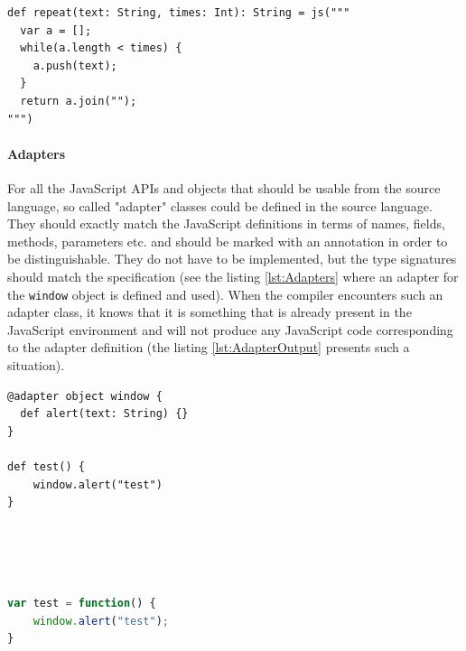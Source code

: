 \documentclass[12pt,a4paper]{report}
\begin{document}
\begin{minipage}{\linewidth}
\begin{lstlisting}[caption={Native code block example.},label={lst:NativeCodeBlock}]
def repeat(text: String, times: Int): String = js("""
  var a = [];
  while(a.length < times) {
    a.push(text);
  }
  return a.join("");
""")
\end{lstlisting}
\end{minipage}

\paragraph{Adapters} For all the JavaScript APIs and objects that should be usable from the source language, so called "adapter" classes could be defined in the source language. They should exactly match the JavaScript definitions in terms of names, fields, methods, parameters etc. and should be marked with an annotation in order to be distinguishable. They do not have to be implemented, but the type signatures should match the specification (see the listing \ref{lst:Adapters} where an adapter for the \texttt{window} object is defined and used). When the compiler encounters such an adapter class, it knows that it is something that is already present in the JavaScript environment and will not produce any JavaScript code corresponding to the adapter definition (the listing \ref{lst:AdapterOutput} presents such a situation).

\begin{center}
\begin{minipage}{.48\textwidth}
  \begin{lstlisting}[caption={Adapter definition and usage example.},label={lst:Adapters}]
@adapter object window {
  def alert(text: String) {}
}

def test() {
	window.alert("test")
}
  \end{lstlisting}
\end{minipage}
\hfill
\begin{minipage}{.48\textwidth}
  \begin{lstlisting}[language=JavaScript,caption={Adapter compilation output.},label={lst:AdapterOutput}]
	
	
	
	
var test = function() {
	window.alert("test");
}
  \end{lstlisting}
\end{minipage}
\end{center}
\end{document}
